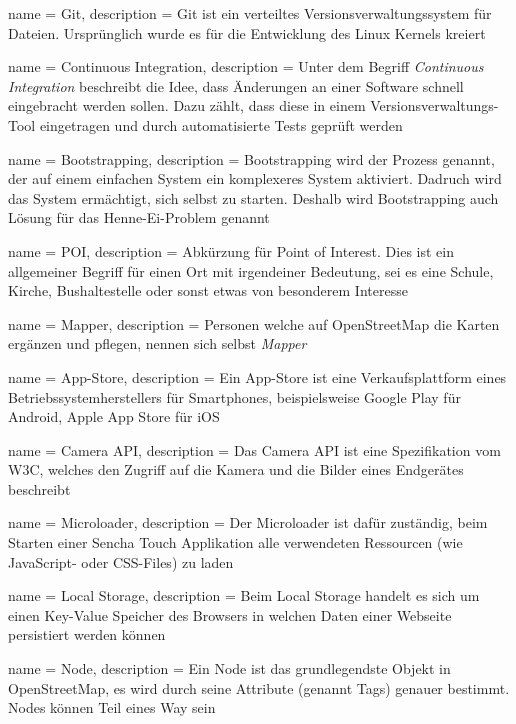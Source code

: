  {
	name = Git,
	description = {Git ist ein verteiltes Versionsverwaltungssystem für Dateien. Ursprünglich wurde es für die Entwicklung des Linux Kernels kreiert}
}

 {
	name = Continuous Integration,
	description = {Unter dem Begriff \emph{Continuous Integration}\cite{cont-integration} beschreibt die Idee, dass Änderungen an einer Software schnell eingebracht werden sollen. Dazu zählt, dass diese in einem Versionsverwaltungs-Tool eingetragen und durch automatisierte Tests geprüft werden}
}

 {
	name = Bootstrapping,
	description = {Bootstrapping wird der Prozess genannt, der auf einem einfachen System ein komplexeres System aktiviert\cite{bootstrapping}. Dadruch wird das System ermächtigt, sich selbst zu starten. Deshalb wird Bootstrapping auch Lösung für das Henne-Ei-Problem genannt}
}

 {
	name = POI,
	description = {Abkürzung für Point of Interest. Dies ist ein allgemeiner Begriff für einen Ort mit irgendeiner Bedeutung, sei es eine Schule, Kirche, Bushaltestelle oder sonst etwas von besonderem Interesse}
}

 {
	name = Mapper,
	description = {Personen welche auf OpenStreetMap die Karten ergänzen und pflegen, nennen sich selbst \emph{Mapper}}
}

 {
	name = App-Store,
	description = {Ein App-Store ist eine Verkaufsplattform eines Betriebssystemherstellers für Smartphones, beispielsweise Google Play für Android, Apple App Store für iOS}
}

 {
	name = Camera API,
	description = {Das Camera API ist eine Spezifikation vom W3C\cite{camera-api}, welches den Zugriff auf die Kamera und die Bilder eines Endgerätes beschreibt}
}

 {
	name = Microloader,
	description = {Der Microloader ist dafür zuständig, beim Starten einer Sencha Touch Applikation alle verwendeten Ressourcen (wie JavaScript- oder CSS-Files) zu laden}
}

 {
	name = Local Storage,
	description = {Beim Local Storage handelt es sich um einen Key-Value Speicher des Browsers in welchen Daten einer Webseite persistiert werden können}
}

 {
	name = Node,
	description = {Ein Node ist das grundlegendste Objekt in OpenStreetMap, es wird durch seine Attribute (genannt \glspl{Tag}) genauer bestimmt. Nodes können Teil eines \gls{Way} sein}
}

